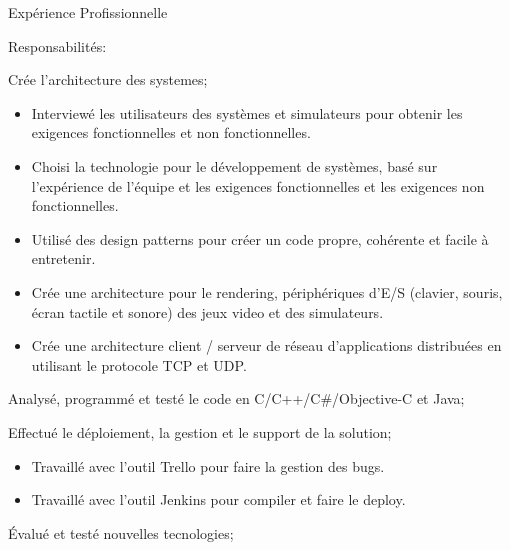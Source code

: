 \documentclass{resume}
\begin{document}
\begin{rSection}{Expérience Profissionnelle}
      \begin{rSubsection}{\fontsize{9}{10}\selectfont Responsabilités:}{}{}{}
        \item Crée l’architecture des systemes;
          \begin{addmargin}[1em]{2em}
            \renewcommand\labelitemi{$\cdot$}
            \begin{itemize}
              \item Interviewé les utilisateurs des systèmes et simulateurs pour obtenir les exigences fonctionnelles et non fonctionnelles.
              \item Choisi la technologie pour le développement de systèmes, basé sur l'expérience de l'équipe et les exigences fonctionnelles et les exigences non fonctionnelles.
              \item Utilisé des design patterns pour créer un code propre, cohérente et facile à entretenir.
              \item Crée une architecture pour le rendering, périphériques d'E/S (clavier, souris, écran tactile et sonore) des jeux video et des simulateurs.
              \item Crée une architecture client / serveur de réseau d'applications distribuées en utilisant le protocole TCP et UDP.\\
            \end{itemize}
          \end{addmargin}
        \item Analysé, programmé et testé le code en C/C++/C\#/Objective-C et Java;
        \item Effectué le déploiement, la gestion et le support de la solution;
            \begin{addmargin}[1em]{2em}
              \renewcommand\labelitemi{$\cdot$}
                \begin{itemize}
                  \item Travaillé avec l'outil Trello pour faire la gestion des bugs.
                  \item Travaillé avec l'outil Jenkins pour compiler et faire le deploy.
                \end{itemize}
            \end{addmargin}
        \item Évalué et testé nouvelles tecnologies;
      \end{rSubsection}


\end{rSection}
\end{document}

